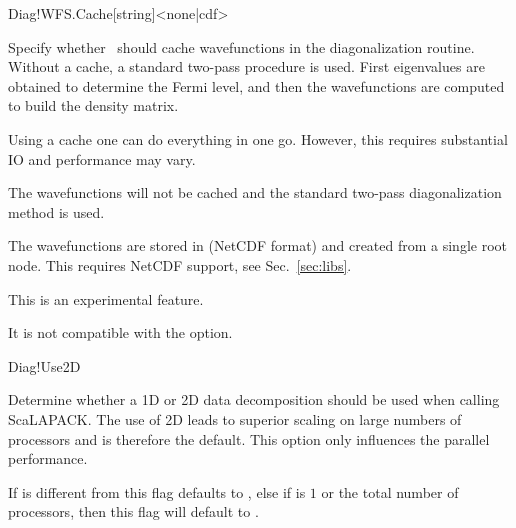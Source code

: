 \begin{fdfentry}{Diag!WFS.Cache}[string]<none|cdf>

  Specify whether \siesta\ should cache wavefunctions in the
  diagonalization routine. Without a cache, a standard two-pass
  procedure is used. First eigenvalues are obtained to determine the
  Fermi level, and then the wavefunctions are computed to build the
  density matrix.

  Using a cache one can do everything in one go. However, this
  requires substantial IO and performance may vary.

  \begin{fdfoptions}

    \option[none]%

    The wavefunctions will not be cached and the standard two-pass
    diagonalization method is used.

    \option[cdf]%

    The wavefunctions are stored in  (NetCDF format) and
    created from a single root node. This requires NetCDF support, see
    Sec.~\ref{sec:libs}.

    \note This is an experimental feature.

    \note It is not compatible with the 
    option.

  \end{fdfoptions}

\end{fdfentry}


\begin{fdflogicalT}{Diag!Use2D}

  Determine whether a 1D or 2D data decomposition should be used when
  calling ScaLAPACK. The use of 2D leads to superior scaling on large
  numbers of processors and is therefore the default. This option only
  influences the parallel performance.

  If  is different from  this flag
  defaults to \fdftrue, else if  is $1$ or the
  total number of processors, then this flag will default to
  \fdffalse.

\end{fdflogicalT}


